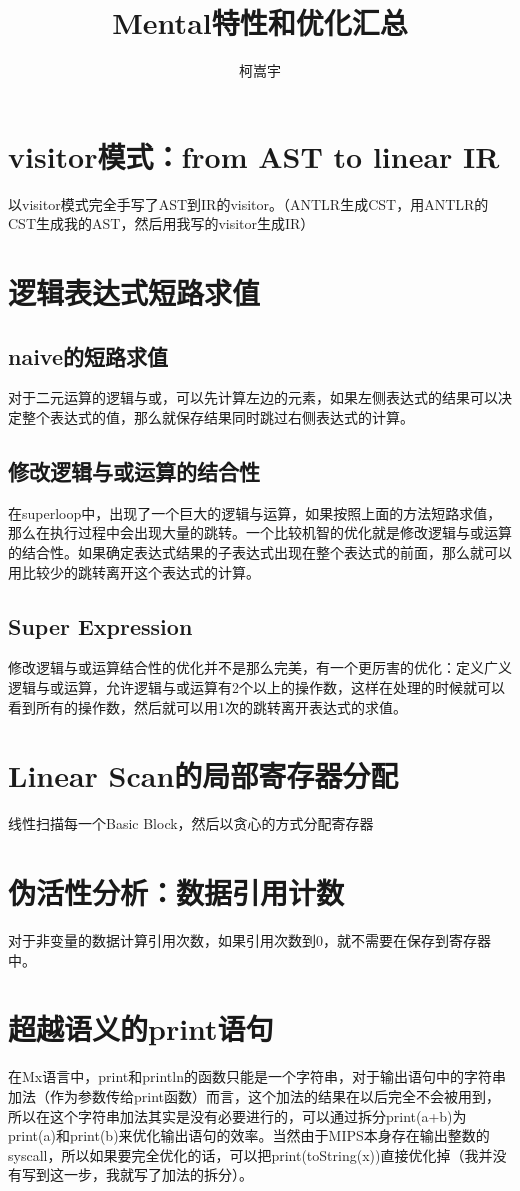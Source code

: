 \documentclass[11pt,a4paper]{article}
\title{Mental特性和优化汇总}
\author{柯嵩宇}
\begin{document}
\maketitle
\tableofcontents

\newpage
\section{visitor模式：from AST to linear IR}
	以visitor模式完全手写了AST到IR的visitor。（ANTLR生成CST，用ANTLR的CST生成我的AST，然后用我写的visitor生成IR）
\section{逻辑表达式短路求值}
\subsection{naive的短路求值}
	对于二元运算的逻辑与或，可以先计算左边的元素，如果左侧表达式的结果可以决定整个表达式的值，那么就保存结果同时跳过右侧表达式的计算。
\subsection{修改逻辑与或运算的结合性}
	在superloop中，出现了一个巨大的逻辑与运算，如果按照上面的方法短路求值，那么在执行过程中会出现大量的跳转。一个比较机智的优化就是修改逻辑与或运算的结合性。如果确定表达式结果的子表达式出现在整个表达式的前面，那么就可以用比较少的跳转离开这个表达式的计算。
\subsection{Super Expression}
	修改逻辑与或运算结合性的优化并不是那么完美，有一个更厉害的优化：定义广义逻辑与或运算，允许逻辑与或运算有2个以上的操作数，这样在处理的时候就可以看到所有的操作数，然后就可以用1次的跳转离开表达式的求值。
\section{Linear Scan的局部寄存器分配}
	线性扫描每一个Basic Block，然后以贪心的方式分配寄存器
\section{伪活性分析：数据引用计数}
	对于非变量的数据计算引用次数，如果引用次数到0，就不需要在保存到寄存器中。
\section{超越语义的print语句}
	在Mx语言中，print和println的函数只能是一个字符串，对于输出语句中的字符串加法（作为参数传给print函数）而言，这个加法的结果在以后完全不会被用到，所以在这个字符串加法其实是没有必要进行的，可以通过拆分print(a+b)为print(a)和print(b)来优化输出语句的效率。当然由于MIPS本身存在输出整数的syscall，所以如果要完全优化的话，可以把print(toString(x))直接优化掉（我并没有写到这一步，我就写了加法的拆分）。
\end{document}
